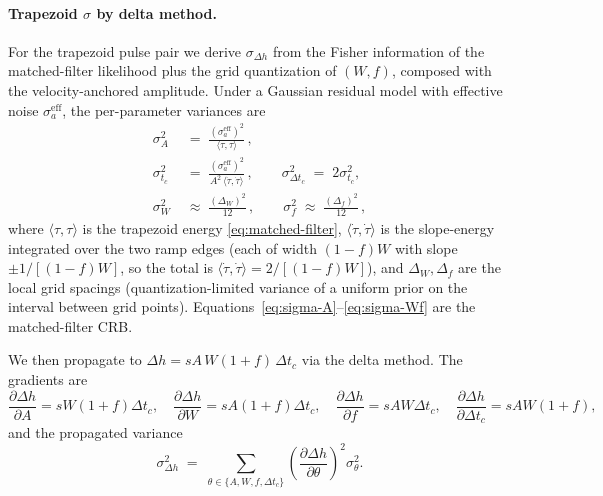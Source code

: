 \paragraph{Trapezoid $\sigma$ by delta method.}
For the trapezoid pulse pair we derive $\sigma_{\Delta h}$ from the
Fisher information of the matched-filter likelihood plus the grid
quantization of $(W,f)$, composed with the velocity-anchored
amplitude. Under a Gaussian residual model with effective noise
$\sigma_a^\mathrm{eff}$, the per-parameter variances are
\begin{align}
  \sigma_A^2 \;&=\; \frac{(\sigma_a^\mathrm{eff})^2}{\langle\tau,\tau\rangle}\,, \label{eq:sigma-A}\\
  \sigma_{t_c}^2 \;&=\; \frac{(\sigma_a^\mathrm{eff})^2}{A^2\,\langle\dot\tau,\dot\tau\rangle}\,,
  \qquad
  \sigma_{\Delta t_c}^2 \;=\; 2\sigma_{t_c}^2, \label{eq:sigma-tc}\\
  \sigma_W^2 \;&\approx\; \frac{(\Delta_W)^2}{12}\,,
  \qquad
  \sigma_f^2 \;\approx\; \frac{(\Delta_f)^2}{12}\,, \label{eq:sigma-Wf}
\end{align}
where $\langle\tau,\tau\rangle$ is the trapezoid energy
\eqref{eq:matched-filter}, $\langle\dot\tau,\dot\tau\rangle$ is the
slope-energy integrated over the two ramp edges (each of width
$(1-f)W$ with slope $\pm1/[(1-f)W]$, so the total is
$\langle\dot\tau,\dot\tau\rangle = 2/[(1-f)W]$), and
$\Delta_W,\Delta_f$ are the local grid spacings (quantization-limited
variance of a uniform prior on the interval between grid points).
Equations~\eqref{eq:sigma-A}--\eqref{eq:sigma-Wf} are the
matched-filter CRB.

We then propagate to $\Delta h=sA\,W(1+f)\,\Delta t_c$ via the delta
method. The gradients are
\begin{equation}
  \frac{\partial \Delta h}{\partial A} = s W(1+f)\Delta t_c,\quad
  \frac{\partial \Delta h}{\partial W} = s A(1+f)\Delta t_c,\quad
  \frac{\partial \Delta h}{\partial f} = s A W \Delta t_c,\quad
  \frac{\partial \Delta h}{\partial \Delta t_c} = s A W(1+f),
  \label{eq:dh-gradients}
\end{equation}
and the propagated variance
\begin{equation}
  \sigma_{\Delta h}^{2} \;=\;
  \sum_{\theta\in\{A,W,f,\Delta t_c\}}
  \left(\frac{\partial\Delta h}{\partial\theta}\right)^{\!2}\sigma_\theta^2.
  \label{eq:sigma-delta-method}
\end{equation}

